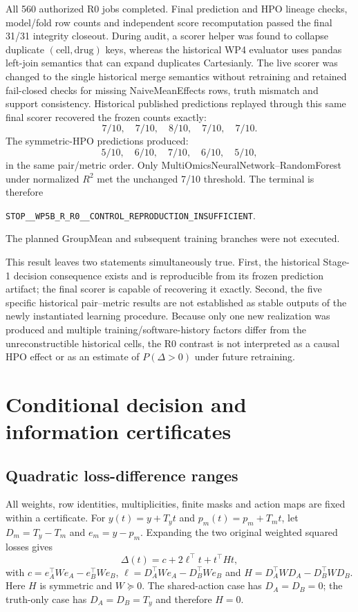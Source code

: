 \documentclass[11pt]{article}
\begin{document}
All 560 authorized R0 jobs completed. Final prediction and HPO lineage checks, model/fold row counts and independent score recomputation passed the final 31/31 integrity closeout. During audit, a scorer helper was found to collapse duplicate $(\mathrm{cell},\mathrm{drug})$ keys, whereas the historical WP4 evaluator uses pandas left-join semantics that can expand duplicates Cartesianly. The live scorer was changed to the single historical merge semantics without retraining and retained fail-closed checks for missing NaiveMeanEffects rows, truth mismatch and support consistency. Historical published predictions replayed through this same final scorer recovered the frozen counts exactly:
\[
7/10,\quad 7/10,\quad 8/10,\quad 7/10,\quad 7/10.
\]
The symmetric-HPO predictions produced:
\[
5/10,\quad 6/10,\quad 7/10,\quad 6/10,\quad 5/10,
\]
in the same pair/metric order. Only MultiOmicsNeuralNetwork--RandomForest under normalized $R^2$ met the unchanged 7/10 threshold. The terminal is therefore
\begin{center}
\texttt{STOP\_\_WP5B\_R\_R0\_\_CONTROL\_REPRODUCTION\_INSUFFICIENT}.
\end{center}
The planned GroupMean and subsequent training branches were not executed.

This result leaves two statements simultaneously true. First, the historical Stage-1 decision consequence exists and is reproducible from its frozen prediction artifact; the final scorer is capable of recovering it exactly. Second, the five specific historical pair--metric results are not established as stable outputs of the newly instantiated learning procedure. Because only one new realization was produced and multiple training/software-history factors differ from the unreconstructible historical cells, the R0 contrast is not interpreted as a causal HPO effect or as an estimate of $P(\Delta>0)$ under future retraining.


\section{Conditional decision and information certificates}


\subsection{Quadratic loss-difference ranges}
All weights, row identities, multiplicities, finite masks and action maps are fixed within a certificate. For $y(t)=y+T_yt$ and $p_m(t)=p_m+T_mt$, let $D_m=T_y-T_m$ and $e_m=y-p_m$. Expanding the two original weighted squared losses gives
\[
\Delta(t)=c+2\ell^\top t+t^\top Ht,
\]
with $c=e_A^\top We_A-e_B^\top We_B$, $\ell=D_A^\top We_A-D_B^\top We_B$ and $H=D_A^\top WD_A-D_B^\top WD_B$. Here $H$ is symmetric and $W\succeq0$. The shared-action case has $D_A=D_B=0$; the truth-only case has $D_A=D_B=T_y$ and therefore $H=0$.
\end{document}
